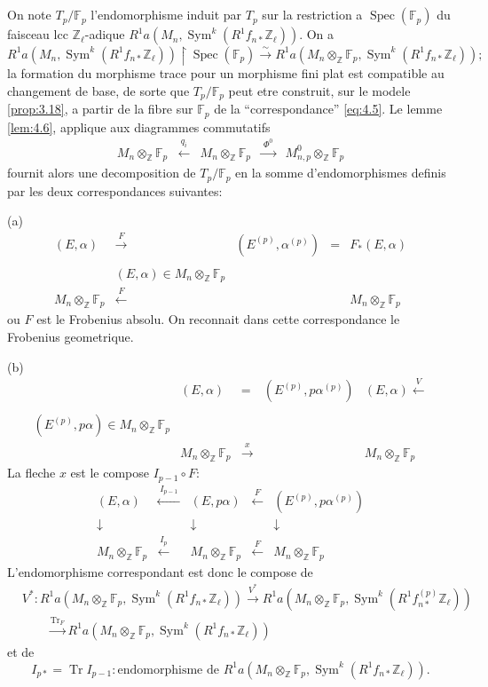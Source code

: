 \documentclass[11pt,reqno]{amsart}
\theoremstyle{plain}
\theoremstyle{remark}
\DeclareMathOperator{\Sym}{Sym}
\DeclareMathOperator{\Spec}{Spec}
\DeclareMathOperator{\Tr}{Tr}
\newcommand{\Z}{\mathbb{Z}}
\newcommand{\F}{\mathbb{F}}
\newcommand{\isom}{\xrightarrow{\sim}}
\newcommand{\xto}[1]{\xrightarrow{#1}}
\numberwithin{equation}{section}
\begin{document}
\subsection{}\label{subsec:4.7}

On note $T_p/\F_p$ l'endomorphisme induit par $T_p$ sur la restriction a $\Spec(\F_p)$ du faisceau lcc $\Z_\ell$-adique $R^1a(M_n, \Sym^k(R^1f_{n*}\Z_\ell))$. On a
\[
R^1a(M_n, \Sym^k(R^1f_{n*}\Z_\ell)) \restriction \Spec(\F_p) \isom R^1a(M_n \otimes_\Z \F_p, \Sym^k(R^1f_{n*}\Z_\ell));
\]
la formation du morphisme trace pour un morphisme fini plat est compatible au changement de base, de sorte que $T_p/\F_p$ peut etre construit, sur le modele \ref{prop:3.18}, a partir de la fibre sur $\F_p$ de la ``correspondance'' \eqref{eq:4.5}. Le lemme \ref{lem:4.6}, applique aux diagrammes commutatifs
\[
\begin{array}{ccccc}
M_n \otimes_\Z \F_p & \xleftarrow{\;q_i\;} & M_n \otimes_\Z \F_p & \xrightarrow{\;\Phi^0\;} & M_{n,p}^0 \otimes_\Z \F_p
\end{array}
\]
fournit alors une decomposition de $T_p/\F_p$ en la somme d'endomorphismes definis par les deux correspondances suivantes:

(a)
\[
\begin{array}{ccccc}
(E, \alpha) & \xrightarrow{\;F\;} & (E^{(p)}, \alpha^{(p)}) & = & F_*(E, \alpha) \\
& & & & \\
& (E, \alpha) \in M_n \otimes_\Z \F_p & & & \\
M_n \otimes_\Z \F_p & \xleftarrow{\;F\;} & & & M_n \otimes_\Z \F_p
\end{array}
\]
ou $F$ est le Frobenius absolu. On reconnait dans cette correspondance le Frobenius geometrique.

(b)
\[
\begin{array}{ccccc}
& (E, \alpha) & = & (E^{(p)}, p\alpha^{(p)}) & (E, \alpha) \xleftarrow{\;V\;} \\
& & & & \\
(E^{(p)}, p\alpha) \in M_n \otimes_\Z \F_p & & & & \\
& M_n \otimes_\Z \F_p & \xrightarrow{\;x\;} & & M_n \otimes_\Z \F_p
\end{array}
\]
La fleche $x$ est le compose $I_{p-1} \circ F$:
\[
\begin{array}{ccccc}
(E, \alpha) & \xleftarrow{\;I_{p-1}\;} & (E, p\alpha) & \xleftarrow{\;F\;} & (E^{(p)}, p\alpha^{(p)}) \\
\downarrow & & \downarrow & & \downarrow \\
M_n \otimes_\Z \F_p & \xleftarrow{\;I_p\;} & M_n \otimes_\Z \F_p & \xleftarrow{\;F\;} & M_n \otimes_\Z \F_p
\end{array}
\]
L'endomorphisme correspondant est donc le compose de
\[
\begin{aligned}
&V^*: R^1a(M_n \otimes_\Z \F_p, \Sym^k(R^1f_{n*}\Z_\ell)) \xto{V^*} R^1a(M_n \otimes_\Z \F_p, \Sym^k(R^1f_{n*}^{(p)}\Z_\ell)) \\
&\qquad \xto{\Tr_F} R^1a(M_n \otimes_\Z \F_p, \Sym^k(R^1f_{n*}\Z_\ell))
\end{aligned}
\]
et de
\[
I_{p*} = \Tr I_{p-1}: \text{endomorphisme de } R^1a(M_n \otimes_\Z \F_p, \Sym^k(R^1f_{n*}\Z_\ell)).
\]
\end{document}

